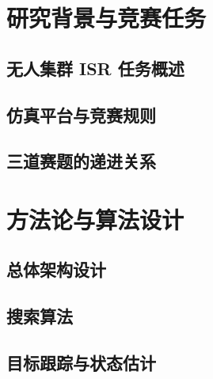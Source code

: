 \documentclass[openany,12pt,UTF8]{ctexbook}
\begin{document}
\frontmatter

\tableofcontents
\mainmatter


\chapter{研究背景与竞赛任务}

\section{无人集群 ISR 任务概述}


\section{仿真平台与竞赛规则}


\section{三道赛题的递进关系}


\chapter{方法论与算法设计}

\section{总体架构设计}


\section{搜索算法}


\section{目标跟踪与状态估计}
\end{document}
